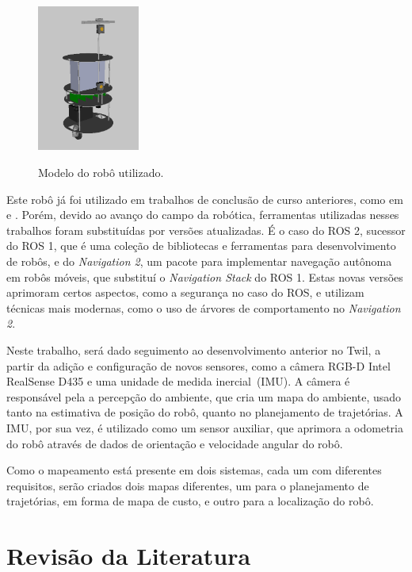 \documentclass[repeatfields,xlists,xpacks,oneside,yearsonly]{ufrgscca}
\begin{document}
\begin{figure}[h]
    {
        \centering
        \caption{Modelo do robô utilizado.}
        \label{fig:robo_rviz}
        \includegraphics[width=0.3\textwidth]{robo_rviz.png}\\
    }
\end{figure}

Este robô já foi utilizado em trabalhos de conclusão de curso
anteriores, como em \textcite{petry_tcc} e \textcite{rahul_tcc}.
Porém, devido ao avanço do campo da robótica, ferramentas utilizadas
nesses trabalhos foram substituídas por versões atualizadas. É o caso
do ROS 2, sucessor do ROS 1, que é uma coleção de bibliotecas e
ferramentas para desenvolvimento de robôs, e do \textit{Navigation
    2}, um pacote para implementar navegação autônoma em robôs móveis,
que substituí o \textit{Navigation Stack} do ROS 1. Estas novas
versões aprimoram certos aspectos, como a segurança no caso do ROS, e
utilizam técnicas mais modernas, como o uso de árvores de
comportamento no \textit{Navigation 2}.

Neste trabalho, será dado seguimento ao desenvolvimento anterior no
Twil, a partir da adição e configuração de novos sensores, como a
câmera RGB-D Intel RealSense D435 e uma unidade de medida
inercial~(IMU). A câmera é responsável pela a percepção do ambiente,
que cria um mapa do ambiente, usado tanto na estimativa de posição do
robô, quanto no planejamento de trajetórias. A IMU, por sua vez, é
utilizado como um sensor auxiliar, que aprimora a odometria do robô
através de dados de orientação e velocidade angular do robô.

Como o mapeamento está presente em dois sistemas, cada um com
diferentes requisitos, serão criados dois mapas diferentes, um para o
planejamento de trajetórias, em forma de mapa de custo, e outro para
a localização do robô.

\chapter{Revisão da Literatura}
\label{revisao}
\end{document}
